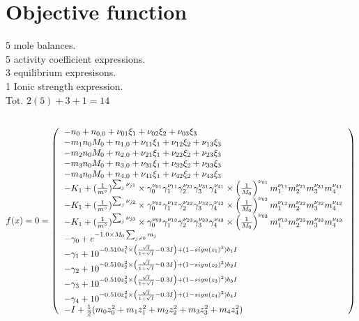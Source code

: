 \documentclass[onecolumn]{article}
\begin{document}
\section{Objective function}
5 mole balances. \\
5 activity coefficient expressions. \\
3 equilibrium expresisons. \\
1 Ionic strength expression. \\
Tot. $2(5) + 3 + 1 = 14$\\
\\
\[
f(x) = 0 = \left(
\begin{tabular}{l}
$-n_0 + n_{0,0} + \nu_{01}\xi_1 + \nu_{02}\xi_2 + \nu_{03}\xi_3  $\\
$-m_1 n_0 M_0 + n_{1,0} + \nu_{11}\xi_1 + \nu_{12}\xi_2 + \nu_{13}\xi_3  $\\
$-m_2 n_0 M_0 + n_{2,0} + \nu_{21}\xi_1 + \nu_{22}\xi_2 + \nu_{23}\xi_3  $\\
$-m_3 n_0 M_0 + n_{3,0} + \nu_{31}\xi_1 + \nu_{32}\xi_2 + \nu_{33}\xi_3  $\\
$-m_4 n_0 M_0 + n_{4,0} + \nu_{41}\xi_1 + \nu_{42}\xi_2 + \nu_{43}\xi_3  $\\
$-K_1 + (\frac{1}{m^{\circ}})^{\sum_j{\nu_{j1}}}\times
\gamma_0^{\nu_{01}}\gamma_1^{\nu_{11}}\gamma_2^{\nu_{21}}
\gamma_3^{\nu_{31}}\gamma_4^{\nu_{41}}\times
\left(\frac{1}{M_0}\right)^{\nu_{01}}m_1^{\nu_{11}}m_2^{\nu_{21}}
m_3^{\nu_{31}}m_4^{\nu_{41}}$\\
$-K_1 + (\frac{1}{m^{\circ}})^{\sum_j{\nu_{j2}}}\times
\gamma_0^{\nu_{02}}\gamma_1^{\nu_{12}}\gamma_2^{\nu_{22}}
\gamma_3^{\nu_{32}}\gamma_4^{\nu_{42}}\times
\left(\frac{1}{M_0}\right)^{\nu_{02}}m_1^{\nu_{12}}m_2^{\nu_{22}}
m_3^{\nu_{32}}m_4^{\nu_{42}}$\\
$-K_1 + (\frac{1}{m^{\circ}})^{\sum_j{\nu_{j3}}}\times
\gamma_0^{\nu_{03}}\gamma_1^{\nu_{13}}\gamma_2^{\nu_{23}}
\gamma_3^{\nu_{33}}\gamma_4^{\nu_{43}}\times
\left(\frac{1}{M_0}\right)^{\nu_{03}}m_1^{\nu_{13}}m_2^{\nu_{23}}
m_3^{\nu_{33}}m_4^{\nu_{43}}$\\
$-\gamma_0 + e^{-1.0\times M_0 \sum_{j\neq0}{m_j}}$ \\
$-\gamma_1 +10^{- 0.510z_1^2 \times
\left(\frac{\sqrt{I}}{1+\sqrt{I}}-0.3I\right) + (1-sign(z_1)^2)b_1 I}$ \\
$-\gamma_2 +10^{- 0.510z_2^2 \times
\left(\frac{\sqrt{I}}{1+\sqrt{I}}-0.3I\right) + (1-sign(z_2)^2)b_2 I}$ \\
$-\gamma_3 +10^{- 0.510z_3^2 \times
\left(\frac{\sqrt{I}}{1+\sqrt{I}}-0.3I\right) + (1-sign(z_3)^2)b_3 I}$ \\
$-\gamma_4 +10^{- 0.510z_4^2 \times
\left(\frac{\sqrt{I}}{1+\sqrt{I}}-0.3I\right) + (1-sign(z_4)^2)b_4 I}$ \\
$-I + \frac{1}{2}(m_0 z_0^2 +  m_1 z_1^2 + m_2 z_2^2 + m_3 z_3^2 + m_4 z_4^2)$
\end{tabular}
\right)
\]
\end{document}
